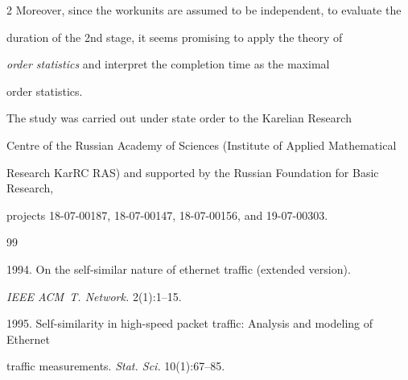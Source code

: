 \begin{multicols}{2}
 Moreover, since the workunits are assumed to be independent, to evaluate the  

 duration of the  2nd stage, it seems promising to  apply the theory of 

 \textit{order statistics} and interpret the completion  time as the maximal 

 order statistics. 





\Ack

\noindent

The study was carried out under state order to the Karelian Research 

Centre of the Russian Academy of Sciences (Institute of Applied Mathematical 

Research KarRC RAS) and supported by the Russian Foundation for Basic Research, 

projects 18-07-00187, 18-07-00147, 18-07-00156, and 19-07-00303.





\renewcommand{\bibname}{\protect\rmfamily References}








{\small\frenchspacing

{ %

\begin{thebibliography}{99}







 1994. On the self-similar nature of ethernet traffic (extended version). 

 \textit{IEEE ACM~T. Network.} 2(1):1--15.



1995. Self-similarity in high-speed packet traffic: Analysis and modeling of Ethernet 

traffic measurements. \textit{Stat. Sci.} 10(1):67--85.



\end{thebibliography}}}
\end{multicols}
